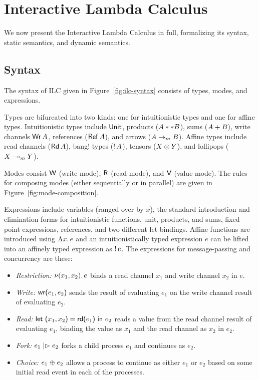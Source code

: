 \section{Interactive Lambda Calculus}
\label{sec:ilc}

We now present the Interactive Lambda Calculus in full, formalizing its syntax,
static semantics, and dynamic semantics.

\subsection{Syntax}
\label{subsec:syntax}



The syntax of ILC given in Figure~\ref{fig:ilc-syntax} consists of types, modes,
and expressions.

Types are bifurcated into two kinds: one for intuitionistic types and one for
affine types. Intuitionistic types include $\text{\textsf{Unit}}$, products
(${A} ** {B}$), sums (${A} + {B}$), write channels $\text{\textsf{Wr}}\,A$, references
($\text{\textsf{Ref}}\,A$), and arrows (${A}\rightarrow_{\footnotesize m}{B}$). Affine types
include read channels ($\text{\textsf{Rd}}\,A$), bang! types (${!}\,{A}$), tensors
(${X}\otimes{Y}$), and lollipops (${X}\multimap_{\footnotesize m}{Y}$).

Modes consist $\textsf{W}$ (write mode), $\textsf{R}$ (read mode), and $\textsf{V}$ (value mode). The
rules for composing modes (either sequentially or in parallel) are given in
Figure~\ref{fig:mode-composition}.

Expressions include variables (ranged over by $x$), the standard introduction
and elimination forms for intuitionistic functions, unit, products, and sums,
fixed point expressions, references, and two different let bindings. Affine
functions are introduced using $\Lambda{x}.\,{e}$ and an intuitionistically typed
expression $e$ can be lifted into an affinely typed expression as
${!}\,{e}$. The expressions for message-passing and concurrency are these:
\begin{itemize}[leftmargin=*]
  \item \emph{Restriction:} $\nu(x_1, x_2).\,e$ binds a read channel $x_1$ and
    write channel $x_2$ in $e$.
  \item \emph{Write:} $\text{\textsf{wr}}\textsf{(}{e_1},{e_2}\textsf{)}$ sends the result of evaluating $e_1$ on
    the write channel result of evaluating $e_2$.
  \item \emph{Read:} $\text{\textsf{let}}\ {\textsf{(}{x_1},{x_2}\textsf{)}} = {\text{\textsf{rd}}\textsf{(}{e_1}\textsf{)}}\ \text{\textsf{in}}\ {{e_2}}$ reads a value from the read
    channel result of evaluating $e_1$, binding the value as $x_1$ and the read
    channel as $x_2$ in $e_2$.
  \item \emph{Fork:} $e_1 \mathrel{|\rhd} e_2$ forks a child process $e_1$ and
    continues as $e_2$.
  \item \emph{Choice:} $e_1 \mathrel{\oplus} e_2$ allows a process to continue as
    either $e_1$ or $e_2$ based on some initial read event in each of the
    processes.
\end{itemize}

